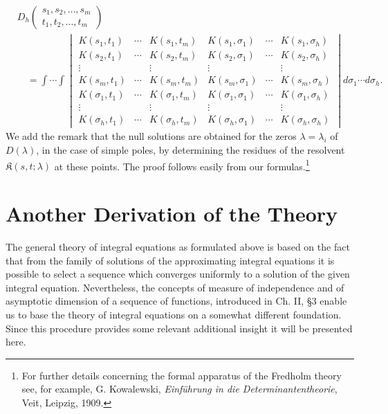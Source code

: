 \begin{equation}\tag{80}
\begin{aligned}
&D_h\!\left(\begin{matrix}s_1,s_2,\ldots,s_m\\t_1,t_2,\ldots,t_m\end{matrix}\right)\\
&\quad=\int\!\cdots\!\int
\begin{vmatrix}
K(s_1,t_1)&\cdots&K(s_1,t_m)&K(s_1,\sigma_1)&\cdots&K(s_1,\sigma_h)\\
K(s_2,t_1)&\cdots&K(s_2,t_m)&K(s_2,\sigma_1)&\cdots&K(s_2,\sigma_h)\\
\vdots&&\vdots&\vdots&&\vdots\\
K(s_m,t_1)&\cdots&K(s_m,t_m)&K(s_m,\sigma_1)&\cdots&K(s_m,\sigma_h)\\
K(\sigma_1,t_1)&\cdots&K(\sigma_1,t_m)&K(\sigma_1,\sigma_1)&\cdots&K(\sigma_1,\sigma_h)\\
\vdots&&\vdots&\vdots&&\vdots\\
K(\sigma_h,t_1)&\cdots&K(\sigma_h,t_m)&K(\sigma_h,\sigma_1)&\cdots&K(\sigma_h,\sigma_h)
\end{vmatrix}
 d\sigma_1\cdots d\sigma_h.
\end{aligned}
\end{equation}
We add the remark that the null solutions are obtained for the zeros $\lambda=\lambda_i$ of $D(\lambda)$, in the case of simple poles, by determining the residues of the resolvent $\mathfrak{K}(s,t;\lambda)$ at these points. The proof follows easily from our formulas.\footnote{For further details concerning the formal apparatus of the Fredholm theory see, for example, G. Kowalewski, \emph{Einf\"uhrung in die Determinantentheorie}, Veit, Leipzig, 1909.}

\section{Another Derivation of the Theory}
The general theory of integral equations as formulated above is based on the fact that from the family of solutions of the approximating integral equations it is possible to select a sequence which converges uniformly to a solution of the given integral equation. Nevertheless, the concepts of measure of independence and of asymptotic dimension of a sequence of functions, introduced in Ch. II, \S3 enable us to base the theory of integral equations on a somewhat different foundation. Since this procedure provides some relevant additional insight it will be presented here.

